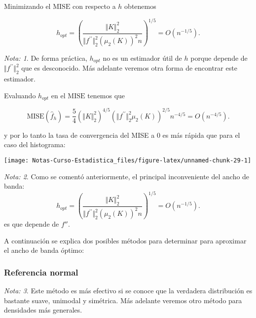 \documentclass[
  12pt,
]{book}
\theoremstyle{definition}
\theoremstyle{definition}
\theoremstyle{definition}
\theoremstyle{definition}
\theoremstyle{remark}
\newtheorem*{remark}{Nota: }
\begin{document}
Minimizando el \(\mathrm{MISE}\) con respecto a \(h\) obtenemos

\begin{equation*}
h_{opt}=\left(\frac{\Vert K\Vert_{2}^{2}}{\Vert f^{\prime\prime}\Vert_{2}^{2}\left(\mu_{2}(K)\right)^{2}n}\right)^{1/5}=O\left( n^{-1/5} \right).
\end{equation*}

\begin{remark}
De forma práctica, \(h_{opt}\) no es un estimador útil de \(h\) porque depende de \(\Vert f^{\prime\prime}\Vert_{2}^{2}\) que es desconocido. Más adelante veremos otra forma de encontrar este estimador.
\end{remark}

Evaluando \(h_{opt}\) en el \(\mathrm{MISE}\) tenemos que

\begin{equation*}
\mathrm{MISE}(\hat{f}_{h})=\frac{5}{4}\left(\Vert K\Vert_{2}^{2}\right)^{4/5}\left(\Vert f^{\prime\prime}\Vert_{2}^{2}\mu_{2}(K)\right)^{2/5}n^{-4/5} = O\left( n^{-4/5} \right).
\end{equation*}

y por lo tanto la tasa de convergencia del MISE a 0 es más rápida que para el caso del histograma:

\begin{center}\texttt{[image: Notas-Curso-Estadistica\_files/figure-latex/unnamed-chunk-29-1]} \end{center}

\begin{remark}
Como se comentó anteriormente, el principal inconveniente del ancho de banda:
\begin{equation*}
h_{opt}=\left(\frac{\Vert K\Vert_{2}^{2}}{\Vert f^{\prime\prime}\Vert_{2}^{2}\left(\mu_{2}(K)\right)^{2}n}\right)^{1/5}=O\left( n^{-1/5} \right).
\end{equation*}
es que depende de \(f''\).
\end{remark}

A continuación se explica dos posibles métodos para determinar para aproximar el ancho de banda óptimo:

\hypertarget{referencia-normal}{%
\subsubsection{Referencia normal}\label{referencia-normal}}

\begin{remark}
Este método es más efectivo si se conoce que la verdadera distribución es bastante suave, unimodal y simétrica. Más adelante veremos otro método para densidades más generales.
\end{remark}
\end{document}
